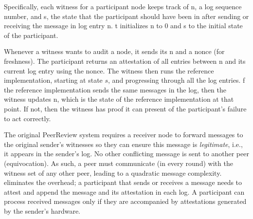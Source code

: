 Specifically, each witness for a participant node keeps track of n, a log sequence number, and s, the state that the participant should have been in after sending or receiving the message in log entry n. t initializes n to 0 and s to the initial state of the participant.

Whenever a witness wants to audit a node, it sends its n and a nonce (for freshness).
The participant returns an attestation of all entries between n and its current log entry using the nonce. The witness then runs the reference implementation, starting at state $s$, and progressing through all the log entries. f the reference implementation sends the same messages in the log, then the witness updates n, %
which is the state of the reference implementation at that point. If not, then the witness has proof it can present of the participant's failure to act correctly.




The original PeerReview system requires a receiver node to forward messages to the original sender's witnesses so they can ensure this message is {\em legitimate}, i.e., it appears in the sender's log. No other conflicting message is sent to another peer (equivocation). As such, a peer must communicate (in every round) with the witness set of any other peer, leading to a quadratic message complexity. \projecttitle{} eliminates the overhead; a participant that sends or receives a message needs to attest and append the message and its attestation in each log. A participant can process received messages only if they are accompanied by attestations generated by the sender's \projecttitle{} hardware. 



\noindent{}






